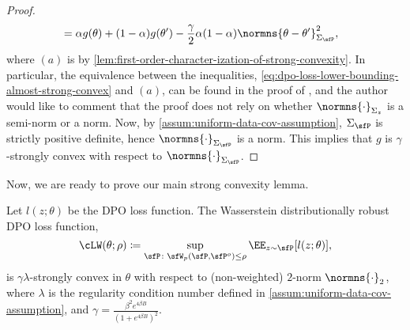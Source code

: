 \begin{proof}
\begin{align*}
    &= \alpha g(\theta) + (1-\alpha) g(\theta') - \frac{\gamma}{2}\alpha(1-\alpha)\normns{\theta-\theta'}^2_{\Sigma_{\sfP}},
\end{align*}
where $(a)$ is by \cref{lem:first-order-character-ization-of-strong-convexity}. In particular, the equivalence between the inequalities, \cref{eq:dpo-loss-lower-bounding-almost-strong-convex} and $(a)$, can be found in the proof of \citet[Theorem 5.24]{beck2017first}, and the author would like to comment that the proof does not rely on whether $\normns{\cdot}_{\Sigma_z}$ is a semi-norm or a norm. Now, by \cref{assum:uniform-data-cov-assumption}, $\Sigma_{\sfP}$ is strictly positive definite, hence $\normns{\cdot}_{\Sigma_{\sfP}}$ is a norm. This implies that $g$ is $\gamma$-strongly convex with respect to $\normns{\cdot}_{\Sigma_{\sfP}}$.
\end{proof}
Now, we are ready to prove our main strong convexity lemma.
\begin{lemma}\label{lem:proof-of-lemma-1}
    Let $l(z;\theta)$ be the DPO loss function. The Wasserstein distributionally robust DPO loss function,
    \begin{equation*}
     \cLW(\theta;\rho) \coloneqq \sup_{\sfP\colon\sfW_p(\sfP,\sfP^o)\leq\rho} \EE_{z\sim\sfP}[l(z;\theta)],
    \end{equation*}
    is $\gamma\lambda$-strongly convex in $\theta$ with respect to (non-weighted) $2$-norm $\normns{\cdot}_2$, where $\lambda$ is the regularity condition number defined in \cref{assum:uniform-data-cov-assumption}, and $\gamma=\frac{\beta^2e^{4\beta B}}{(1+e^{4\beta B})^2}$.
\end{lemma}
